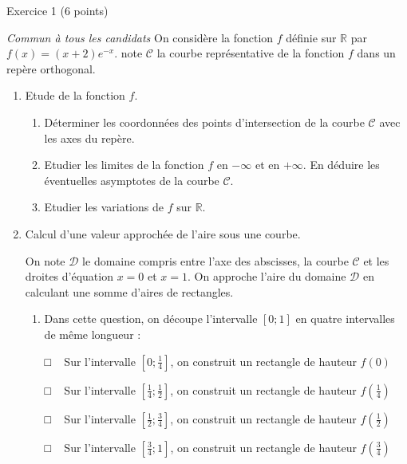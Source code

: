 
%
\begin{h2}Exercice 1   (6 points)\end{h2}
\textit{Commun à tous les candidats}
On considère la fonction $f$ définie sur $\mathbb{R}$ par $f\left(x\right)=\left(x+2\right) e^{-x}$. 
\parOn note $\mathscr C$ la courbe représentative de la fonction $f$ dans un repère orthogonal.
\begin{enumerate}
     \item
     Etude de la fonction $f$.
     \begin{enumerate}[label=\alph*.]
          \item
          Déterminer les coordonnées des points d'intersection de la courbe $\mathscr C$ avec les axes du repère.
          \item
          Etudier les limites de la fonction $f$ en $-\infty $ et en $+\infty $. En déduire les éventuelles asymptotes de la courbe $\mathscr C$.
          \item
     Etudier les variations de $f$ sur $\mathbb{R}$.\end{enumerate}
     \item
     Calcul d'une valeur approchée de l'aire sous une courbe.
     \par
     On note $\mathscr D$ le domaine compris entre l'axe des abscisses, la courbe $\mathscr C$ et les droites d'équation $x=0$ et $x=1$. On approche l'aire du domaine $\mathscr D$ en calculant une somme d'aires de rectangles.
     \begin{enumerate}[label=\alph*.]
          \item
          Dans cette question, on découpe l'intervalle $[0;1]$ en quatre intervalles de même longueur :
          \par
          □   Sur l'intervalle $\left[0; \frac{1}{4}\right]$, on construit un rectangle de hauteur $f\left(0\right)$
          \par
          □   Sur l'intervalle $\left[\frac{1}{4} ; \frac{1}{2}\right]$, on construit un rectangle de hauteur $f \left(\frac{1}{4}\right)$
          \par
          □   Sur l'intervalle $\left[\frac{1}{2} ; \frac{3}{4}\right]$, on construit un rectangle de hauteur $f \left(\frac{1}{2}\right)$
          \par
          □   Sur l'intervalle $\left[\frac{3}{4} ; 1\right]$, on construit un rectangle de hauteur $f \left(\frac{3}{4}\right)$

\end{enumerate}
\end{enumerate}
